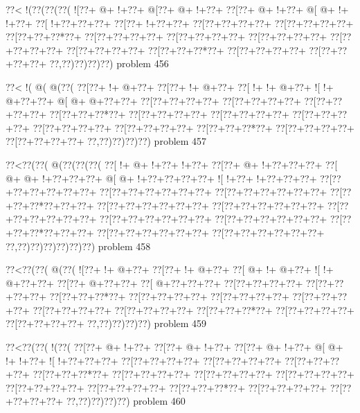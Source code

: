 \vbox{\vbox{\goo
\0??<\- !(\0??(\0??(\0??(
\- ![\0??+\- @+\- !+\0??+
\- @[\0??+\- @+\- !+\0??+
\0??[\0??+\- @+\- !+\0??+
\- @[\- @+\- !+\- !+\0??+
\0??[\- !+\0??+\0??+\0??+
\0??[\0??+\- !+\0??+\0??+
\0??[\0??+\0??+\0??+\0??+
\0??[\0??+\0??+\0??+\0??+
\0??[\0??+\0??+\0??*\0??+
\0??[\0??+\0??+\0??+\0??+
\0??[\0??+\0??+\0??+\0??+
\0??[\0??+\0??+\0??+\0??+
\0??[\0??+\0??+\0??+\0??+
\0??[\0??+\0??+\0??+\0??+
\0??[\0??+\0??+\0??*\0??+
\0??[\0??+\0??+\0??+\0??+
\0??[\0??+\0??+\0??+\0??+
\0??,\0??)\0??)\0??)\0??)
}
\hfil problem 456\hfil\break
}

\vbox{\vbox{\goo
\0??<\- !(\- @(\- @(\0??(
\0??[\0??+\- !+\- @+\0??+
\0??[\0??+\- !+\- @+\0??+
\0??[\- !+\- !+\- @+\0??+
\- ![\- !+\- @+\0??+\0??+
\- @[\- @+\- @+\0??+\0??+
\0??[\0??+\0??+\0??+\0??+
\0??[\0??+\0??+\0??+\0??+
\0??[\0??+\0??+\0??+\0??+
\0??[\0??+\0??+\0??*\0??+
\0??[\0??+\0??+\0??+\0??+
\0??[\0??+\0??+\0??+\0??+
\0??[\0??+\0??+\0??+\0??+
\0??[\0??+\0??+\0??+\0??+
\0??[\0??+\0??+\0??+\0??+
\0??[\0??+\0??+\0??*\0??+
\0??[\0??+\0??+\0??+\0??+
\0??[\0??+\0??+\0??+\0??+
\0??,\0??)\0??)\0??)\0??)
}
\hfil problem 457\hfil\break
}

\vbox{\vbox{\goo
\0??<\0??(\0??(\- @(\0??(\0??(\0??(
\0??[\- !+\- @+\- !+\0??+\- !+\0??+
\0??[\0??+\- @+\- !+\0??+\0??+\0??+
\0??[\- @+\- @+\- !+\0??+\0??+\0??+
\- @[\- @+\- !+\0??+\0??+\0??+\0??+
\- ![\- !+\0??+\- !+\0??+\0??+\0??+
\0??[\0??+\0??+\0??+\0??+\0??+\0??+
\0??[\0??+\0??+\0??+\0??+\0??+\0??+
\0??[\0??+\0??+\0??+\0??+\0??+\0??+
\0??[\0??+\0??+\0??*\0??+\0??+\0??+
\0??[\0??+\0??+\0??+\0??+\0??+\0??+
\0??[\0??+\0??+\0??+\0??+\0??+\0??+
\0??[\0??+\0??+\0??+\0??+\0??+\0??+
\0??[\0??+\0??+\0??+\0??+\0??+\0??+
\0??[\0??+\0??+\0??+\0??+\0??+\0??+
\0??[\0??+\0??+\0??*\0??+\0??+\0??+
\0??[\0??+\0??+\0??+\0??+\0??+\0??+
\0??[\0??+\0??+\0??+\0??+\0??+\0??+
\0??,\0??)\0??)\0??)\0??)\0??)\0??)
}
\hfil problem 458\hfil\break
}

\vbox{\vbox{\goo
\0??<\0??(\0??(\- @(\0??(
\- ![\0??+\- !+\- @+\0??+
\0??[\0??+\- !+\- @+\0??+
\0??[\- @+\- !+\- @+\0??+
\- ![\- !+\- @+\0??+\0??+
\0??[\0??+\- @+\0??+\0??+
\0??[\- @+\0??+\0??+\0??+
\0??[\0??+\0??+\0??+\0??+
\0??[\0??+\0??+\0??+\0??+
\0??[\0??+\0??+\0??*\0??+
\0??[\0??+\0??+\0??+\0??+
\0??[\0??+\0??+\0??+\0??+
\0??[\0??+\0??+\0??+\0??+
\0??[\0??+\0??+\0??+\0??+
\0??[\0??+\0??+\0??+\0??+
\0??[\0??+\0??+\0??*\0??+
\0??[\0??+\0??+\0??+\0??+
\0??[\0??+\0??+\0??+\0??+
\0??,\0??)\0??)\0??)\0??)
}
\hfil problem 459\hfil\break
}

\vbox{\vbox{\goo
\0??<\0??(\0??(\- !(\0??(
\0??[\0??+\- @+\- !+\0??+
\0??[\0??+\- @+\- !+\0??+
\0??[\0??+\- @+\- !+\0??+
\- @[\- @+\- !+\- !+\0??+
\- ![\- !+\0??+\0??+\0??+
\0??[\0??+\0??+\0??+\0??+
\0??[\0??+\0??+\0??+\0??+
\0??[\0??+\0??+\0??+\0??+
\0??[\0??+\0??+\0??*\0??+
\0??[\0??+\0??+\0??+\0??+
\0??[\0??+\0??+\0??+\0??+
\0??[\0??+\0??+\0??+\0??+
\0??[\0??+\0??+\0??+\0??+
\0??[\0??+\0??+\0??+\0??+
\0??[\0??+\0??+\0??*\0??+
\0??[\0??+\0??+\0??+\0??+
\0??[\0??+\0??+\0??+\0??+
\0??,\0??)\0??)\0??)\0??)
}
\hfil problem 460\hfil\break
}

